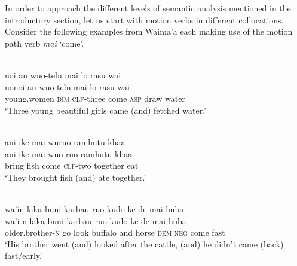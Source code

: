 In order to approach the different levels of semantic analysis mentioned in the introductory section, let us start with motion verbs in different collocations. Consider the following examples from Waima'a each making use of the motion path verb \textit{mai} `come'. 

\ea \label{WMH_Julio_goat099}
\\
\glll noi an wuo-telu mai lo rasu wai \\
nonoi an wuo-telu mai lo rasu wai \\
young.women \textsc{dim} \textsc{clf}-three come \textsc{asp} draw water\\
\glft `Three young beautiful girls came (and) fetched water.'\\ 
\z

\ea \label{WMH_Julio_goat049}
\\
\glll ani ike mai wuruo ramhutu khaa \\
ani ike mai wuo-ruo ramhutu khaa \\
bring fish come \textsc{clf}-two together eat\\
\glft `They brought fish (and) ate together.'\\
\z

\ea \label{WMH_Julio_goat057}
\\
\glll wa'in laka buni karbau ruo kudo ke de mai huba \\
wa'i-n laka buni karbau ruo kudo ke de mai huba \\
older.brother-\textsc{n} go look buffalo and horse \textsc{dem} \textsc{neg} come fast\\
\glft `His brother went (and) looked after the cattle, (and) he didn't came (back) fast/early.'\\
\z

